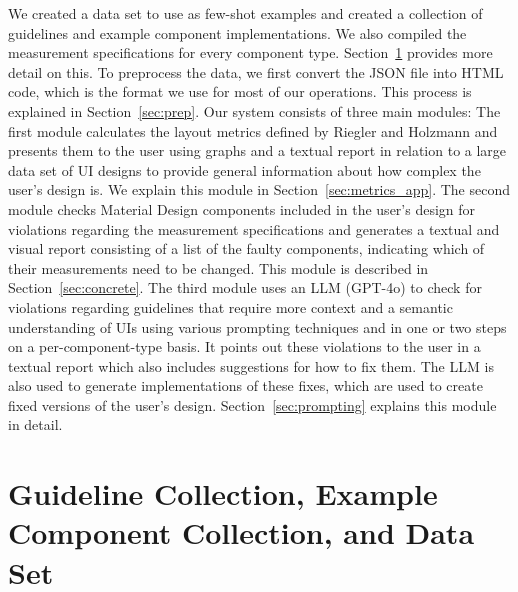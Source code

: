 \documentclass[11pt,titlepage,oneside,openany]{book}
\begin{document}
We created a data set to use as few-shot examples and created a collection of guidelines and example component implementations. We also compiled the measurement specifications for every component type. Section~\ref{sec:dataset} provides more detail on this. To preprocess the data, we first convert the JSON file into HTML code, which is the format we use for most of our operations. This process is explained in Section~\ref{sec:prep}. Our system consists of three main modules: The first module calculates the layout metrics defined by Riegler and Holzmann \cite{riegler_measuring_2018} and presents them to the user using graphs and a textual report in relation to a large data set of UI designs to provide general information about how complex the user's design is. We explain this module in Section~\ref{sec:metrics_app}. The second module checks Material Design components included in the user's design for violations regarding the measurement specifications and generates a textual and visual report consisting of a list of the faulty components, indicating which of their measurements need to be changed. This module is described in Section~\ref{sec:concrete}. The third module uses an LLM (GPT-4o) to check for violations regarding guidelines that require more context and a semantic understanding of UIs using various prompting techniques and in one or two steps on a per-component-type basis. It points out these violations to the user in a textual report which also includes suggestions for how to fix them. The LLM is also used to generate implementations of these fixes, which are used to create fixed versions of the user's design. Section~\ref{sec:prompting} explains this module in detail.


\section{Guideline Collection, Example Component Collection, and Data Set}\label{sec:dataset}
\end{document}

